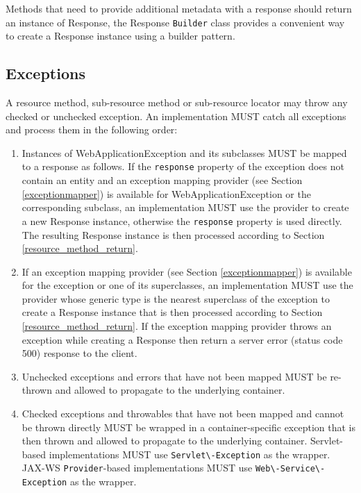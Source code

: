 Methods that need to provide additional metadata with a response should return an instance of Response, the Response
\lstinline{Builder} class provides a convenient way to create a Response instance using a builder pattern.

\subsection{Exceptions}
\label{method_exc}

A resource method, sub-resource method or sub-resource locator may throw any checked or unchecked exception. An
implementation MUST catch all exceptions and process them in the following order:

\begin{enumerate}
    \item Instances of WebApplicationException and its subclasses MUST be mapped to a response as follows. If the
    \lstinline{response} property of the exception does not contain an entity and an exception mapping provider (see
    Section \ref{exceptionmapper}) is available for WebApplicationException or the corresponding subclass, an
    implementation MUST use the provider to create a new Response instance, otherwise the \lstinline{response} property
    is used directly. The resulting Response instance is then processed according to Section
    \ref{resource_method_return}.
    \item If an exception mapping provider (see Section \ref{exceptionmapper}) is available for the exception or one of
    its superclasses, an implementation MUST use the provider whose generic type is the nearest superclass of the
    exception to create a Response instance that is then processed according to Section \ref{resource_method_return}.
    If the exception mapping provider throws an exception while creating a Response then return a server error (status
    code 500) response to the client.
    \item\label{runtimeexc} Unchecked exceptions and errors that have not been mapped MUST be re-thrown and allowed to
    propagate to the underlying container.
    \item\label{checkedexc} Checked exceptions and throwables that have not been mapped and cannot be thrown directly
    MUST be wrapped in a container-specific exception that is then thrown and allowed to propagate to the underlying
    container. Servlet-based implementations MUST use \lstinline{Servlet\-Exception} as the wrapper. JAX-WS
    \lstinline{Provider}-based implementations MUST use \lstinline{Web\-Service\-Exception} as the wrapper.
\end{enumerate}

